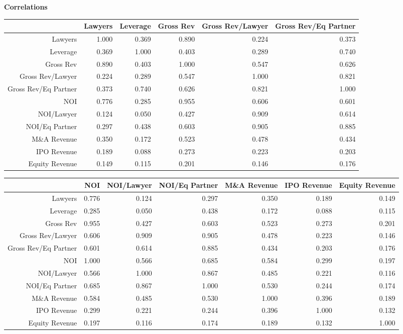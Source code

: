 \documentclass{article}
\begin{document}
\newpage
{\large \textbf{Correlations} }%
\begin{table}[H]
\centering
\begin{tabular}{rrrrrr}
  \hline
 & Lawyers & Leverage & Gross Rev & Gross Rev/Lawyer & Gross Rev/Eq Partner \\ 
  \hline
Lawyers & 1.000 & 0.369 & 0.890 & 0.224 & 0.373 \\ 
  Leverage & 0.369 & 1.000 & 0.403 & 0.289 & 0.740 \\ 
  Gross Rev & 0.890 & 0.403 & 1.000 & 0.547 & 0.626 \\ 
  Gross Rev/Lawyer & 0.224 & 0.289 & 0.547 & 1.000 & 0.821 \\ 
  Gross Rev/Eq Partner & 0.373 & 0.740 & 0.626 & 0.821 & 1.000 \\ 
  NOI & 0.776 & 0.285 & 0.955 & 0.606 & 0.601 \\ 
  NOI/Lawyer & 0.124 & 0.050 & 0.427 & 0.909 & 0.614 \\ 
  NOI/Eq Partner & 0.297 & 0.438 & 0.603 & 0.905 & 0.885 \\ 
  M\&A Revenue & 0.350 & 0.172 & 0.523 & 0.478 & 0.434 \\ 
  IPO Revenue & 0.189 & 0.088 & 0.273 & 0.223 & 0.203 \\ 
  Equity Revenue & 0.149 & 0.115 & 0.201 & 0.146 & 0.176 \\ 
   \hline
\end{tabular}
\end{table}
\begin{table}[H]
\centering
\begin{tabular}{rrrrrrr}
  \hline
 & NOI & NOI/Lawyer & NOI/Eq Partner & M\&A Revenue & IPO Revenue & Equity Revenue \\ 
  \hline
Lawyers & 0.776 & 0.124 & 0.297 & 0.350 & 0.189 & 0.149 \\ 
  Leverage & 0.285 & 0.050 & 0.438 & 0.172 & 0.088 & 0.115 \\ 
  Gross Rev & 0.955 & 0.427 & 0.603 & 0.523 & 0.273 & 0.201 \\ 
  Gross Rev/Lawyer & 0.606 & 0.909 & 0.905 & 0.478 & 0.223 & 0.146 \\ 
  Gross Rev/Eq Partner & 0.601 & 0.614 & 0.885 & 0.434 & 0.203 & 0.176 \\ 
  NOI & 1.000 & 0.566 & 0.685 & 0.584 & 0.299 & 0.197 \\ 
  NOI/Lawyer & 0.566 & 1.000 & 0.867 & 0.485 & 0.221 & 0.116 \\ 
  NOI/Eq Partner & 0.685 & 0.867 & 1.000 & 0.530 & 0.244 & 0.174 \\ 
  M\&A Revenue & 0.584 & 0.485 & 0.530 & 1.000 & 0.396 & 0.189 \\ 
  IPO Revenue & 0.299 & 0.221 & 0.244 & 0.396 & 1.000 & 0.132 \\ 
  Equity Revenue & 0.197 & 0.116 & 0.174 & 0.189 & 0.132 & 1.000 \\ 
   \hline
\end{tabular}
\end{table}
\end{document}
